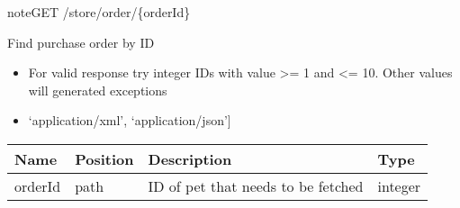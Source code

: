 \documentclass[letterpaper,10pt,english]{sphinxmanual}
\begin{document}
\begin{sphinxadmonition}{note}{GET /store/order/\{orderId\}}

Find purchase order by ID\begin{itemize}
\item {} 
For valid response try integer IDs with value \textgreater{}= 1 and \textless{}= 10. Other values will generated exceptions

\item {} 
\sphinxstylestrong{Produces: 
}{[}‘application/xml’, ‘application/json’{]}

\end{itemize}




\begin{savenotes}\sphinxattablestart
\centering
\begin{tabulary}{\linewidth}[t]{|T|T|T|T|}
\hline
\sphinxstyletheadfamily 
Name
&\sphinxstyletheadfamily 
Position
&\sphinxstyletheadfamily 
Description
&\sphinxstyletheadfamily 
Type
\\
\hline
orderId
&
path
&
ID of pet that needs to be fetched
&
integer
\\
\hline
\end{tabulary}
\par
\sphinxattableend\end{savenotes}




\end{sphinxadmonition}
\end{document}
